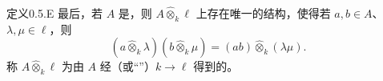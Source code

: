 \begin{SGAresult}{定义}{0.5.E}
最后，若 $A$ 是，则 $A\widehat\otimes_k\ell$ 上存在唯一的结构，使得若 $a,b\in A$、$\lambda,\mu\in\ell$，则
\[(a\widehat\otimes_k\lambda)(b\widehat\otimes_k\mu)=(ab)\widehat\otimes_k(\lambda\mu).\]
称 $A\widehat\otimes_k\ell$ 为由 $A$ 经（或“”）$k\to\ell$ 得到的。
\end{SGAresult}
